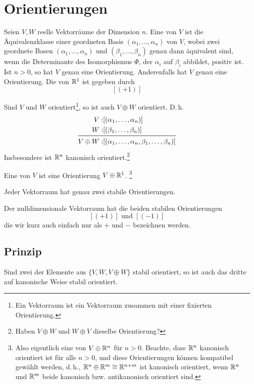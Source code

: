 \section{Orientierungen}
Seien $V,W$ reelle Vektorräume der Dimension $n$.
\Def{}
Eine  von $V$ ist die Äquivalenzklasse einer geordneten Basis $(\alpha_1, \ldots, \alpha_n)$ von $V$, wobei zwei geordnete Basen $(\alpha_1, \ldots, \alpha_n)$ und $(\beta_1, \ldots, \beta_n)$ genau dann äquivalent sind, wenn die Determinante des Isomorphismus $\Phi$, der $\alpha_i$ auf $\beta_i$ abbildet, positiv ist.
\Bem{}
Ist $n> 0$, so hat $V$ genau eine Orientierung. Anderenfalls hat $V$ genau eine Orientierung.
\Def{}
Die  von $\mathbb{R}^1$ ist gegeben durch
\[ [(+1)] \]

\Bem{}
Sind $V$ und $W$ orientiert\footnote{Ein  Vektorraum ist ein Vektorraum zusammen mit einer fixierten Orientierung.}, so ist auch $V\oplus W$ orientiert. D.\,h.
\begin{equation*}
\begin{aligned}
V : &[(\alpha_1, \ldots, \alpha_n)]\\
 W : &[(\beta_1, \ldots, \beta_n)]\\
\midrule
V\oplus W :& [(\alpha_1,\ldots,  \alpha_n, \beta_1, \ldots, \beta_n)]
\end{aligned}
\end{equation*}
Insbesondere ist $\mathbb{R}^n$ kanonisch orientiert.\footnote{Haben $V\oplus W$ und $W \oplus V$ dieselbe Orientierung?}

\Def{}
Eine  von $V$ ist eine Orientierung $V \oplus \mathbb{R}^1$. \footnote{Also eigentlich eine von $V \oplus \mathbb{R}^n$ für $n > 0$. Beachte, dass $\mathbb{R}^n$ kanonisch orientiert ist für alle $n > 0$, und diese Orientierungen können kompatibel gewählt werden, d.\,h., $\mathbb{R}^n \oplus \mathbb{R}^m \overset{}{\cong} \mathbb{R}^{n+m}$ ist kanonisch orientiert, wenn $\mathbb{R}^n$ und $\mathbb{R}^m$ beide kanonisch bzw. antikanonisch orientiert sind.}

\Bem{}
Jeder Vektorraum hat genau zwei stabile Orientierungen.

\Bsp{}
Der nulldimensionale Vektorraum hat die beiden stabilen Orientierungen
\[ [(+1)] \text{ und } [(-1)] \]
die wir kurz auch einfach nur als $+$ und $-$ bezeichnen werden.

\subsection{Prinzip}
Sind zwei der Elemente aus $\{V, W, V\oplus W\}$ stabil orientiert, so ist auch das dritte auf kanonische Weise stabil orientiert.

